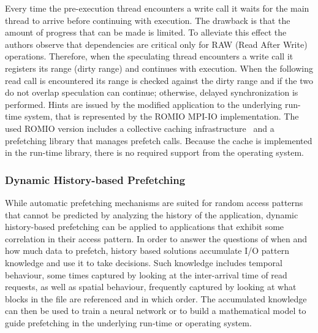 Every time the pre-execution thread encounters a write call it waits for the main thread to arrive before continuing with execution. The drawback is that the amount of progress that can be made is limited. To alleviate this effect 
the authors observe that dependencies are critical only for RAW (Read After Write) operations. Therefore, when the speculating thread encounters a write call it registers its range (dirty range) and continues with execution. When 
the following read call is encountered its range is checked against the dirty range and if the two do not overlap speculation can continue; otherwise, delayed synchronization is performed. Hints are issued by the modified application 
to the underlying run-time system, that is represented by the ROMIO MPI-IO implementation. The used ROMIO version includes a collective caching infrastructure~\cite{Liao2005} and a prefetching library that manages prefetch calls. 
Because the cache is implemented in the run-time library, there is no required support from the operating system.

\subsubsection{Dynamic History-based Prefetching}
While automatic prefetching mechanisms are suited for random access patterns that cannot be predicted by analyzing the history of the application, dynamic history-based prefetching can be applied to applications that exhibit 
some correlation in their access pattern. In order to answer the questions of when and how much data to prefetch, history based solutions accumulate I/O pattern knowledge and use it to take decisions. Such knowledge includes 
temporal behaviour, some times captured by looking at the inter-arrival time of read requests, as well as spatial behaviour, frequently captured by looking at what blocks in the file are referenced and in which order. The 
accumulated knowledge can then be used to train a neural network or to build a mathematical model to guide prefetching in the underlying run-time or operating system.


